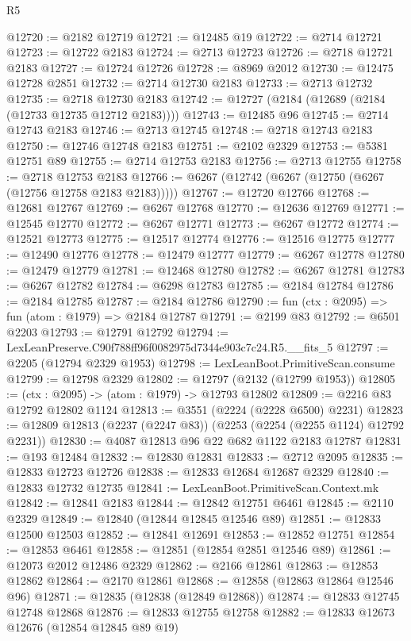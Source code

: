 \begin{lexlean}{R5}
\begin{coremodule}
@12720 := @2182 @12719
@12721 := @12485 @19
@12722 := @2714 @12721
@12723 := @12722 @2183
@12724 := @2713 @12723
@12726 := @2718 @12721 @2183
@12727 := @12724 @12726
@12728 := @8969 @2012
@12730 := @12475 @12728 @2851
@12732 := @2714 @12730 @2183
@12733 := @2713 @12732
@12735 := @2718 @12730 @2183
@12742 := @12727 (@2184 (@12689 (@2184 (@12733 @12735 @12712 @2183))))
@12743 := @12485 @96
@12745 := @2714 @12743 @2183
@12746 := @2713 @12745
@12748 := @2718 @12743 @2183
@12750 := @12746 @12748 @2183
@12751 := @2102 @2329
@12753 := @5381 @12751 @89
@12755 := @2714 @12753 @2183
@12756 := @2713 @12755
@12758 := @2718 @12753 @2183
@12766 := @6267 (@12742 (@6267 (@12750 (@6267 (@12756 @12758 @2183 @2183)))))
@12767 := @12720 @12766
@12768 := @12681 @12767
@12769 := @6267 @12768
@12770 := @12636 @12769
@12771 := @12545 @12770
@12772 := @6267 @12771
@12773 := @6267 @12772
@12774 := @12521 @12773
@12775 := @12517 @12774
@12776 := @12516 @12775
@12777 := @12490 @12776
@12778 := @12479 @12777
@12779 := @6267 @12778
@12780 := @12479 @12779
@12781 := @12468 @12780
@12782 := @6267 @12781
@12783 := @6267 @12782
@12784 := @6298 @12783
@12785 := @2184 @12784
@12786 := @2184 @12785
@12787 := @2184 @12786
@12790 := fun (ctx : @2095) => fun (atom : @1979) => @2184 @12787
@12791 := @2199 @83
@12792 := @6501 @2203
@12793 := @12791 @12792
@12794 := LexLeanPreserve.C90f788ff96f0082975d7344e903c7c24.R5.__fits_5
@12797 := @2205 (@12794 @2329 @1953)
@12798 := LexLeanBoot.PrimitiveScan.consume
@12799 := @12798 @2329
@12802 := @12797 (@2132 (@12799 @1953))
@12805 := (ctx : @2095) -> (atom : @1979) -> @12793 @12802
@12809 := @2216 @83 @12792 @12802 @1124
@12813 := @3551 (@2224 (@2228 @6500) @2231)
@12823 := @12809 @12813 (@2237 (@2247 @83)) (@2253 (@2254 (@2255 @1124) @12792 @2231))
@12830 := @4087 @12813 @96 @22 @682 @1122 @2183 @12787
@12831 := @193 @12484
@12832 := @12830 @12831
@12833 := @2712 @2095
@12835 := @12833 @12723 @12726
@12838 := @12833 @12684 @12687 @2329
@12840 := @12833 @12732 @12735
@12841 := LexLeanBoot.PrimitiveScan.Context.mk
@12842 := @12841 @2183
@12844 := @12842 @12751 @6461
@12845 := @2110 @2329
@12849 := @12840 (@12844 @12845 @12546 @89)
@12851 := @12833 @12500 @12503
@12852 := @12841 @12691
@12853 := @12852 @12751
@12854 := @12853 @6461
@12858 := @12851 (@12854 @2851 @12546 @89)
@12861 := @12073 @2012 @12486 @2329
@12862 := @2166 @12861
@12863 := @12853 @12862
@12864 := @2170 @12861
@12868 := @12858 (@12863 @12864 @12546 @96)
@12871 := @12835 (@12838 (@12849 @12868))
@12874 := @12833 @12745 @12748 @12868
@12876 := @12833 @12755 @12758
@12882 := @12833 @12673 @12676 (@12854 @12845 @89 @19)

\end{coremodule}
\end{lexlean}
